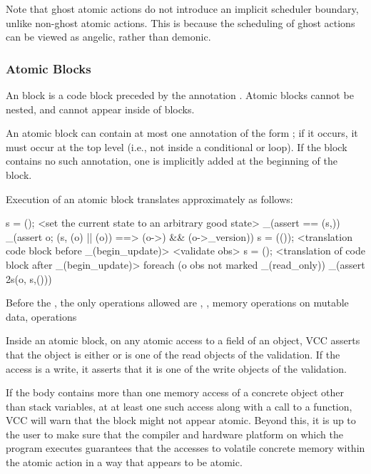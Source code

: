 \documentclass[preprint,nocopyrightspace]{sigplanconf}
\begin{document}
{{{\begin{VCC}
Note that ghost atomic actions do not introduce an implicit scheduler
boundary, unlike non-ghost atomic actions. This is because the
scheduling of ghost actions can be viewed as angelic, rather than
demonic.

\subsubsection{Atomic Blocks}

An  block is a code block preceded by the
annotation . Atomic blocks cannot be nested, and
cannot appear inside of  blocks. 

An atomic block can contain at most one annotation of the
form ; if it occurs, it must occur at the top
level (i.e., not inside a conditional or loop). If the block contains
no such annotation, one is implicitly added at the beginning of the
block. 

Execution of an atomic block translates approximately as follows:
\begin{VCC}
\state s = \now();
<set the current state to an arbitrary good state>
_(assert \me == \at(s,\me))
_(assert \forall \object o; \at(s, \wrapped(o) || \mutable(o))
    ==> \unchanged(o->\version) && \unchanged(o->\volatile_version))
s = \stutter(\now());
<translation code block before _(begin_update)>
<validate obs>
s = \now();
<translation of code block after _(begin_update)>
foreach (\object o \in obs not marked _(read_only))
  _(assert \inv2s(o, s,\now()))
\end{VCC}

Before the , the only operations allowed
are , , memory operations on mutable data,
 operations 

Inside an atomic block, on any atomic access to a field of an object,
VCC asserts that the object is either \vcc{\mutable} or is one of the
read objects of the validation. If the access is a write, it asserts
that it is one of the write objects of the validation.

If the body contains more than one memory access of a concrete object
other than stack variables, at at least one such access along with a
call to a  function, VCC will warn that the block might
not appear atomic. Beyond this, it is up to the user to make sure that the
compiler and hardware platform on which the program executes guarantees that 
the accesses to volatile concrete memory within the
atomic action in a way that appears to be atomic. 


\end{VCC}}}}
\end{document}
